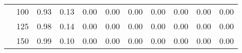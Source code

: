\begin{table}[t]
\begin{center}
\begin{subtable}[c]{\textwidth}
\begin{center}
\begin{tabular}{rcccccccccc}
                                        & \multicolumn{1}{c|}{100}  & \num{0.93}  & \num{0.13}  & \num{0.00}  & \num{0.00}  & \num{0.00}  & \num{0.00}  & \num{0.00}  & \num{0.00}  & \num{0.00}  \\
                                        & \multicolumn{1}{c|}{125}  & \num{0.98}  & \num{0.14}  & \num{0.00}  & \num{0.00}  & \num{0.00}  & \num{0.00}  & \num{0.00}  & \num{0.00}  & \num{0.00}  \\
                                        & \multicolumn{1}{c|}{150}  & \num{0.99}  & \num{0.10}  & \num{0.00}  & \num{0.00}  & \num{0.00}  & \num{0.00}  & \num{0.00}  & \num{0.00}  & \num{0.00}  \\
                                    \end{tabular}
            \end{center}
        \end{subtable}

        \vspace{5mm}


\end{center}
\end{table}
